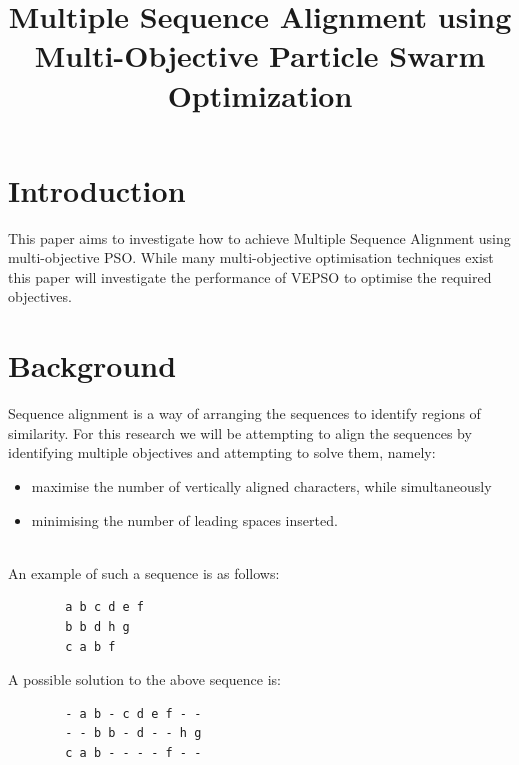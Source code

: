 \documentclass[conference]{IEEEtran}
\begin{document}
\title{Multiple Sequence Alignment using Multi-Objective Particle Swarm Optimization\\
}

\author{
}

\maketitle

\section{Introduction}
This paper aims to investigate how to achieve Multiple Sequence Alignment using multi-objective \ac{PSO}. While many multi-objective optimisation techniques exist this paper will investigate the performance of \ac{VEPSO} to optimise the required objectives.

\section{Background}
Sequence alignment is a way of arranging the sequences to identify regions of similarity. For this research we will be attempting to align the sequences by identifying multiple objectives and attempting to solve them, namely:
\begin{itemize}
	\item maximise the number of vertically aligned characters, while simultaneously
	\item minimising the number of leading spaces inserted.
\end{itemize}\\

An example of such a sequence is as follows:
\begin{lstlisting}
        a b c d e f
        b b d h g
        c a b f
\end{lstlisting}

A possible solution to the above sequence is:

\begin{lstlisting}
        - a b - c d e f - -
        - - b b - d - - h g
        c a b - - - - f - -
\end{lstlisting}
\end{document}

